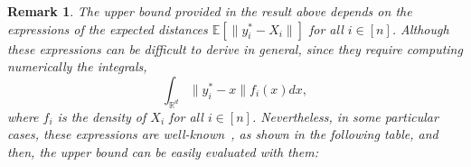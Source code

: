 \documentclass[letter,11pt, reqno]{amsart}
\newcommand{\R}{\mathbb{R}}
\newcommand{\E}{\mathbb{E}}
\renewcommand{\;}{\quad}
\theoremstyle{thmstyleone}%
\theoremstyle{thmstyletwo}%
\newtheorem{remark}{Remark}%
\theoremstyle{thmstylethree}%
\begin{document}
\begin{remark}
    The upper bound provided in the result above depends on the expressions of the expected distances $\E\left[\|y^*_i-X_i\|\right]$ for all $i\in[n]$. Although these expressions can be difficult to derive in general, since they require computing numerically the integrals,
    \begin{equation*}
        \int_{\R^d} \|y^*_i-x\| f_i(x) dx,
    \end{equation*}
    where $f_i$ is the density of $X_i$ for all $i\in[n]$.
    Nevertheless, in some particular cases, these expressions are well-known~\cite[see, e.g.,][]{grimmett2001probability,kotz2000continuous,mardia2000directional}, as shown in the following table, and then, the upper bound can be easily evaluated with them:\\
    
    
    
  
    
    

\end{remark}
\end{document}
